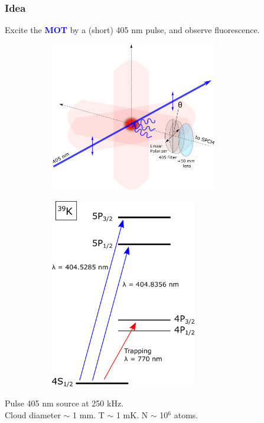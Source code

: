 \documentclass{beamer}
\theoremstyle{definition}
\begin{document}
\begin{frame}
\frametitle{Idea}
Excite the \textcolor{blue}{\textbf{MOT}} by a (short) 405 nm pulse, and observe fluorescence.
\begin{figure}[!htb]
	\vspace{-10pt}
	\centering
	\begin{subfigure}{0.55\textwidth}
	\includegraphics[width=0.8\textwidth]{experimental_geometry}
	\end{subfigure}
	\begin{subfigure}{0.4\textwidth}
	\includegraphics[width=0.7\textwidth]{energy_levels.png}
	\end{subfigure}
\end{figure}

Pulse 405 nm source at 250 kHz.\\
Cloud diameter $\sim$ 1 mm. T $\sim$ 1 mK. N $\sim$ 10$^\text{6}$ atoms.

\end{frame}
\end{document}
